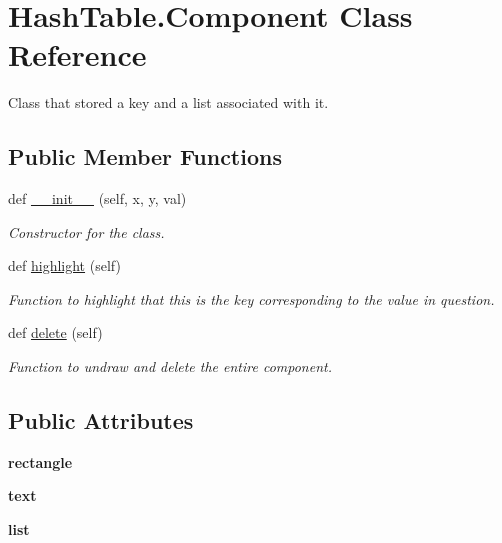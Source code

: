 \hypertarget{class_hash_table_1_1_component}{}\section{Hash\+Table.\+Component Class Reference}
\label{class_hash_table_1_1_component}


Class that stored a key and a list associated with it.  


\subsection*{Public Member Functions}
\begin{DoxyCompactItemize}
\item 
def \hyperlink{class_hash_table_1_1_component_ad467b4ea0187c36b98a463258c18a30e}{\+\_\+\+\_\+init\+\_\+\+\_\+} (self, x, y, val)
\begin{DoxyCompactList}\small\item\em Constructor for the class. \end{DoxyCompactList}\item 
\mbox{\label{class_hash_table_1_1_component_acf540b5e455c6eb2a6db6b5b4f237114}} 
def \hyperlink{class_hash_table_1_1_component_acf540b5e455c6eb2a6db6b5b4f237114}{highlight} (self)
\begin{DoxyCompactList}\small\item\em Function to highlight that this is the key corresponding to the value in question. \end{DoxyCompactList}\item 
\mbox{\label{class_hash_table_1_1_component_ac4fdbb45fac4e992e647130feaab6415}} 
def \hyperlink{class_hash_table_1_1_component_ac4fdbb45fac4e992e647130feaab6415}{delete} (self)
\begin{DoxyCompactList}\small\item\em Function to undraw and delete the entire component. \end{DoxyCompactList}\end{DoxyCompactItemize}
\subsection*{Public Attributes}
\begin{DoxyCompactItemize}
\item 
\mbox{\label{class_hash_table_1_1_component_abe583ebc5c985cec2447736838e49905}} 
{\bfseries rectangle}
\item 
\mbox{\label{class_hash_table_1_1_component_a4633f152c7288e770f0c6b6134a734e3}} 
{\bfseries text}
\item 
\mbox{\label{class_hash_table_1_1_component_a273d2ccaf2699a3ff15332954201a25a}} 
{\bfseries list}
\end{DoxyCompactItemize}


